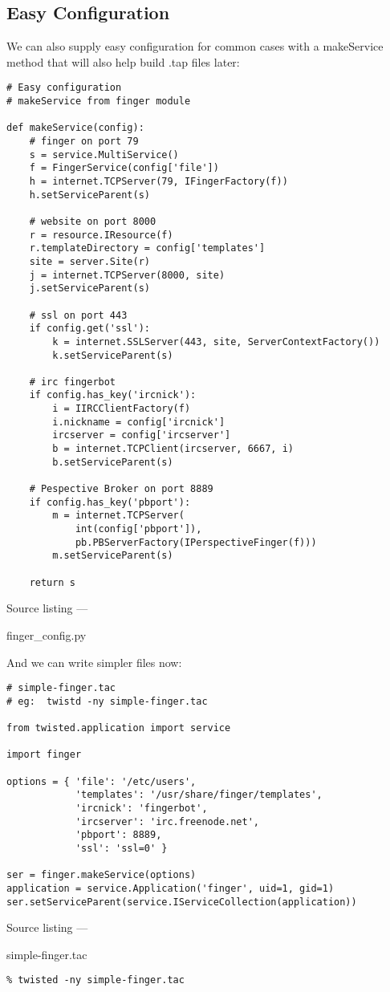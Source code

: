 \subsection{Easy Configuration}


We can also supply easy configuration for common cases with a makeService method that will also help build .tap files later:\begin{verbatim}
# Easy configuration
# makeService from finger module

def makeService(config):
    # finger on port 79
    s = service.MultiService()
    f = FingerService(config['file'])
    h = internet.TCPServer(79, IFingerFactory(f))
    h.setServiceParent(s)

    # website on port 8000
    r = resource.IResource(f)
    r.templateDirectory = config['templates']
    site = server.Site(r)
    j = internet.TCPServer(8000, site)
    j.setServiceParent(s)

    # ssl on port 443
    if config.get('ssl'):
        k = internet.SSLServer(443, site, ServerContextFactory())
        k.setServiceParent(s)

    # irc fingerbot
    if config.has_key('ircnick'):
        i = IIRCClientFactory(f)
        i.nickname = config['ircnick']
        ircserver = config['ircserver']
        b = internet.TCPClient(ircserver, 6667, i)
        b.setServiceParent(s)

    # Pespective Broker on port 8889
    if config.has_key('pbport'):
        m = internet.TCPServer(
            int(config['pbport']),
            pb.PBServerFactory(IPerspectiveFinger(f)))
        m.setServiceParent(s)

    return s
\end{verbatim}\parbox[b]{\linewidth}{\begin{center}Source listing --- \begin{em}finger\_config.py\end{em}\end{center}}

And we can write simpler files now:\begin{verbatim}
# simple-finger.tac
# eg:  twistd -ny simple-finger.tac

from twisted.application import service

import finger

options = { 'file': '/etc/users',
            'templates': '/usr/share/finger/templates',
            'ircnick': 'fingerbot',
            'ircserver': 'irc.freenode.net',
            'pbport': 8889,
            'ssl': 'ssl=0' }

ser = finger.makeService(options)
application = service.Application('finger', uid=1, gid=1)
ser.setServiceParent(service.IServiceCollection(application))
\end{verbatim}\parbox[b]{\linewidth}{\begin{center}Source listing --- \begin{em}simple-finger.tac\end{em}\end{center}}\begin{verbatim}
% twisted -ny simple-finger.tac
\end{verbatim}


